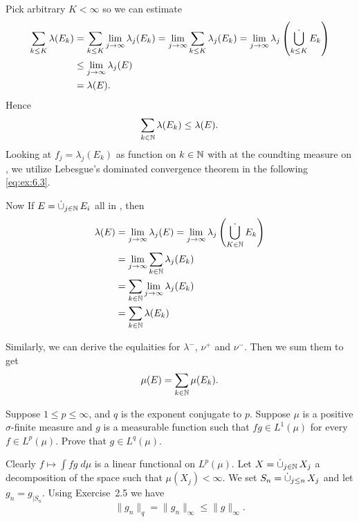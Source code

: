 \begin{enumerate}
Pick arbitrary \(K<\infty\) so we can estimate
\begin{align*}
\sum_{k\leq K} \lambda(E_k)
&= \sum_{k\leq K} \lim_{j\to\infty} \lambda_j(E_k)
 = \lim_{j\to\infty} \sum_{k\leq K} \lambda_j(E_k)
 = \lim_{j\to\infty} \lambda_j\left(\Disjunion_{k\leq K} E_k\right) \\
&\leq \lim_{j\to\infty} \lambda_j(E) \\
&= \lambda(E).
\end{align*}
Hence
\begin{equation*}
\sum_{k\in\mathbb{N}} \lambda(E_k) \leq \lambda(E).
\end{equation*}
Looking at \(f_j = \lambda_j(E_k)\) as function on \(k\in\mathbb{N}\)
with at the coundting measure on \N, we utilize
Lebesgue's dominated convergence theorem
in the following \eqref{eq:ex:6.3}.

Now
If \(E = \disjunion_{j\in\N} E_i\) all in \frakM, then
\begin{align}
\lambda(E)
&= \lim_{j\to\infty} \lambda_j(E)
 = \lim_{j\to\infty} \lambda_j\left(\Disjunion_{K\in\N} E_k\right) \notag \\
&= \lim_{j\to\infty} \sum_{k\in\N} \lambda_j(E_k) \notag \\
&= \sum_{k\in\N} \lim_{j\to\infty} \lambda_j(E_k)  \label{eq:ex:6.3} \\
&= \sum_{k\in\N} \lambda(E_k) \notag
\end{align}

Similarly, we can derive the equlaities for
\(\lambda^-\), \(\nu^+\) and \(\nu^-\). Then we sum them to get
\begin{equation*}
\mu(E) = \sum_{k\in\mathbb{N}}  \mu(E_k).
\end{equation*}


\begin{excopy}
Suppose \(1 \leq p \leq \infty\), and $q$  is the exponent conjugate to $p$.
Suppose \(\mu\) is a positive \(\sigma\)-finite measure and $g$ is a measurable
function such that \(fg\in L^1(\mu)\) for every
\(f\in L^p(\mu)\). Prove that \(g\in L^q(\mu)\).
\end{excopy}

\iffalse
Clearly \(f \mapsto \int fg\;d\mu\) is a linear functional on \(L^p(\mu)\).
Let \(X=\disjunion_{j\in\N} X_j\) a decomposition of the space
such that \(\mu(X_j)<\infty\). We set \(S_n = \disjunion_{j\leq n} X_j\)
and let \(g_n = g_{|S_n}\).
Using Exercise~2.5 we have
\begin{equation*}
\|g_n\|_q = \|g_n\|_\infty \leq \|g\|_\infty.
\end{equation*}


\end{enumerate}
